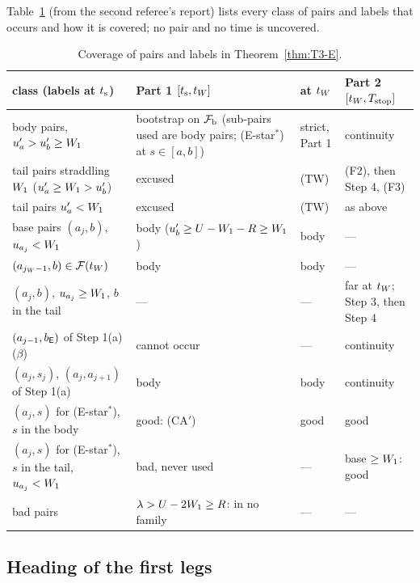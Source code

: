 \medskip
Table~\ref{tab:T3-cover} (from the second referee's report) lists every class of pairs and labels that occurs and how it is
covered; no pair and no time is uncovered.

\begin{table}[ht]
\centering\small
\begin{tabular}{@{}p{}p{}p{}p{}@{}}
\toprule
class (labels at $t_{\mathrm s}$) & Part 1 $[t_{\mathrm s},t_W]$ & at $t_W$ & Part 2 $[t_W,T_{\mathrm{stop}}]$\\
\midrule
body pairs, $u_a'>u_b'\ge W_1$ & bootstrap on $\mathcal F_{\mathrm b}$ (sub-pairs used are body pairs; (E-star$^*$) at $s\in[a,b]$) & strict, Part 1 & continuity\\
tail pairs straddling $W_1$ ($u_a'\ge W_1>u_b'$) & excused & (TW) & (F2), then Step 4, (F3)\\
tail pairs $u_a'<W_1$ & excused & (TW) & as above\\
base pairs $(a_j,b)$, $u_{a_j}<W_1$ & body ($u_b'\ge U-W_1-R\ge W_1$) & body & ---\\
$(a_{j_W-1},b)\in\mathcal F(t_W)$ & body & body & ---\\
$(a_j,b)$, $u_{a_j}\ge W_1$, $b$ in the tail & --- & --- & far at $t_W$; Step 3, then Step 4\\
$(a_{j-1},b_{\mathsf E})$ of Step 1(a)($\beta$) & cannot occur & --- & continuity\\
$(a_j,s_j)$, $(a_j,a_{j+1})$ of Step 1(a) & body & body & continuity\\
$(a_j,s)$ for (E-star$^*$), $s$ in the body & good: (CA$'$) & good & good\\
$(a_j,s)$ for (E-star$^*$), $s$ in the tail, $u_{a_j}<W_1$ & bad, never used & --- & base $\ge W_1$: good\\
bad pairs & $\lambda>U-2W_1\ge R$: in no family & --- & ---\\
\bottomrule
\end{tabular}
\caption{Coverage of pairs and labels in Theorem~\ref{thm:T3-E}.}\label{tab:T3-cover}
\end{table}

\subsection{Heading of the first legs}

